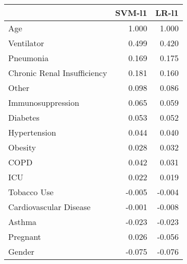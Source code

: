 \begin{tabular}{lrr}
\toprule
{} &  SVM-l1 &  LR-l1 \\
\midrule
Age                         &   1.000 &  1.000 \\
Ventilator                  &   0.499 &  0.420 \\
Pneumonia                   &   0.169 &  0.175 \\
Chronic Renal Insufficiency &   0.181 &  0.160 \\
Other                       &   0.098 &  0.086 \\
Immunosuppression           &   0.065 &  0.059 \\
Diabetes                    &   0.053 &  0.052 \\
Hypertension                &   0.044 &  0.040 \\
Obesity                     &   0.028 &  0.032 \\
COPD                        &   0.042 &  0.031 \\
ICU                         &   0.022 &  0.019 \\
Tobacco Use                 &  -0.005 & -0.004 \\
Cardiovascular Disease      &  -0.001 & -0.008 \\
Asthma                      &  -0.023 & -0.023 \\
Pregnant                    &   0.026 & -0.056 \\
Gender                      &  -0.075 & -0.076 \\
\bottomrule
\end{tabular}
